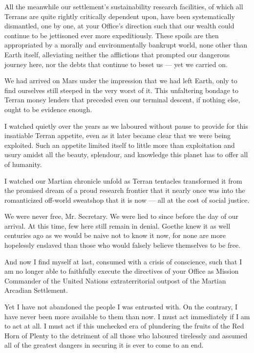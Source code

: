 All the meanwhile our settlement's sustainability research facilities, of which all Terrans are quite rightly critically dependent upon, have been systematically dismantled, one by one, at your Office's direction such that our wealth could continue to be jettisoned ever more expeditiously. These spoils are then appropriated by a morally and environmentally bankrupt world, none other than Earth itself, alleviating neither the afflictions that prompted our dangerous journey here, nor the debts that continue to beset us — yet we carried on.

We had arrived on Mars under the impression that we had left Earth, only to find ourselves still steeped in the very worst of it. This unfaltering bondage to Terran money lenders that preceded even our terminal descent, if nothing else, ought to be evidence enough.

I watched quietly over the years as we laboured without pause to provide for this insatiable Terran appetite, even as it later became clear that we were being exploited. Such an appetite limited itself to little more than exploitation and usury amidst all the beauty, splendour, and knowledge this planet has to offer all of humanity. 

I watched our Martian chronicle unfold as Terran tentacles transformed it from the promised dream of a proud research frontier that it nearly once was into the romanticized off-world sweatshop that it is now — all at the cost of social justice.

We were never free, Mr. Secretary. We were lied to since before the day of our arrival. At this time, few here still remain in denial. Goethe knew it as well centuries ago as we would be naive not to know it now, for none are more hopelessly enslaved than those who would falsely believe themselves to be free.

And now I find myself at last, consumed with a crisis of conscience, such that I am no longer able to faithfully execute the directives of your Office as Mission Commander of the United Nations extraterritorial outpost of the Martian Arcadian Settlement. 

Yet I have not abandoned the people I was entrusted with. On the contrary, I have never been more available to them than now. I must act immediately if I am to act at all. I must act if this unchecked era of plundering the fruits of the Red Horn of Plenty to the detriment of all those who laboured tirelessly and assumed all of the greatest dangers in securing it is ever to come to an end.

